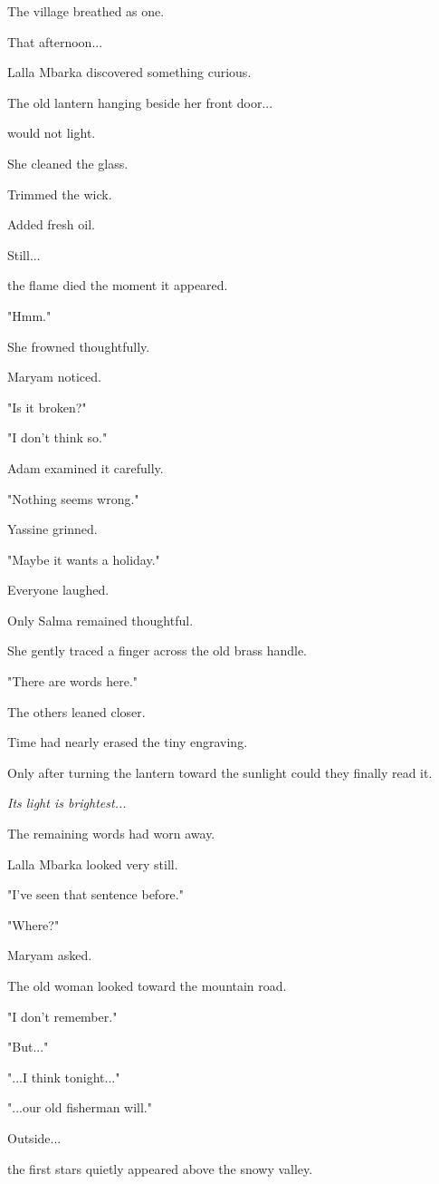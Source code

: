 \documentclass[12pt,openany]{book}
\begin{document}
The village breathed as one.

That afternoon...

Lalla Mbarka discovered something curious.

The old lantern hanging beside her front door...

would not light.

She cleaned the glass.

Trimmed the wick.

Added fresh oil.

Still...

the flame died the moment it appeared.

"Hmm."

She frowned thoughtfully.

Maryam noticed.

"Is it broken?"

"I don't think so."

Adam examined it carefully.

"Nothing seems wrong."

Yassine grinned.

"Maybe it wants a holiday."

Everyone laughed.

Only Salma remained thoughtful.

She gently traced a finger across the old brass handle.

"There are words here."

The others leaned closer.

Time had nearly erased the tiny engraving.

Only after turning the lantern toward the sunlight could they finally read it.

\emph{Its light is brightest...}

The remaining words had worn away.

Lalla Mbarka looked very still.

"I've seen that sentence before."

"Where?"

Maryam asked.

The old woman looked toward the mountain road.

"I don't remember."

"But..."

"...I think tonight..."

"...our old fisherman will."

Outside...

the first stars quietly appeared above the snowy valley.
\end{document}
